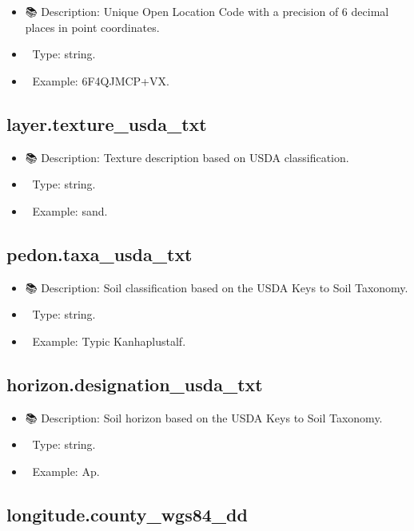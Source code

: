 \documentclass[
  letterpaper,
  DIV=11,
  numbers=noendperiod]{scrreprt}
\providecommand{\tightlist}{%
  \setlength{\itemsep}{0pt}\setlength{\parskip}{0pt}}\usepackage{longtable,booktabs,array}
\begin{document}
\begin{itemize}
\tightlist
\item
  📚 Description: Unique Open Location Code with a precision of 6
  decimal places in point coordinates.
\item
  🔢 Type: string.
\item
  📖 Example: 6F4QJMCP+VX.
\end{itemize}

\subsection{layer.texture\_usda\_txt}\label{layer.texture_usda_txt}

\begin{itemize}
\tightlist
\item
  📚 Description: Texture description based on USDA classification.
\item
  🔢 Type: string.
\item
  📖 Example: sand.
\end{itemize}

\subsection{pedon.taxa\_usda\_txt}\label{pedon.taxa_usda_txt}

\begin{itemize}
\tightlist
\item
  📚 Description: Soil classification based on the USDA Keys to Soil
  Taxonomy.
\item
  🔢 Type: string.
\item
  📖 Example: Typic Kanhaplustalf.
\end{itemize}

\subsection{horizon.designation\_usda\_txt}\label{horizon.designation_usda_txt}

\begin{itemize}
\tightlist
\item
  📚 Description: Soil horizon based on the USDA Keys to Soil Taxonomy.
\item
  🔢 Type: string.
\item
  📖 Example: Ap.
\end{itemize}

\subsection{longitude.county\_wgs84\_dd}\label{longitude.county_wgs84_dd}
\end{document}
